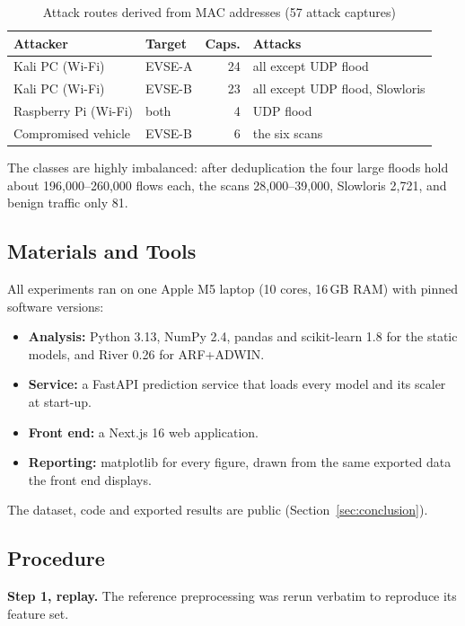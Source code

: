 \documentclass[preprint,12pt]{elsarticle}
\begin{document}
\begin{table}[!t]
\caption{Attack routes derived from MAC addresses (57 attack captures)}
\label{tab:routes}
\centering
\footnotesize
\begin{tabularx}{\columnwidth}{@{}llrL@{}}
\toprule
\textbf{Attacker} & \textbf{Target} & \textbf{Caps.} & \textbf{Attacks} \\
\midrule
Kali PC (Wi-Fi)       & EVSE-A & 24 & all except UDP flood \\
Kali PC (Wi-Fi)       & EVSE-B & 23 & all except UDP flood, Slowloris \\
Raspberry Pi (Wi-Fi)  & both   & 4  & UDP flood \\
Compromised vehicle   & EVSE-B & 6  & the six scans \\
\bottomrule
\end{tabularx}
\end{table}

The classes are highly imbalanced: after deduplication the four large floods hold about 196,000--260,000 flows each, the scans 28,000--39,000, Slowloris 2,721, and benign traffic only 81.

\subsection{Materials and Tools}

All experiments ran on one Apple M5 laptop (10 cores, 16\,GB RAM) with pinned software versions:
\begin{itemize}
    \item \textbf{Analysis:} Python 3.13, NumPy 2.4, pandas and scikit-learn 1.8 \cite{b12} for the static models, and River 0.26 \cite{b9} for ARF+ADWIN.
    \item \textbf{Service:} a FastAPI prediction service that loads every model and its scaler at start-up.
    \item \textbf{Front end:} a Next.js 16 web application.
    \item \textbf{Reporting:} matplotlib for every figure, drawn from the same exported data the front end displays.
\end{itemize}
The dataset, code and exported results are public (Section~\ref{sec:conclusion}).

\subsection{Procedure}

\textbf{Step 1, replay.} The reference preprocessing \cite{b4} was rerun verbatim to reproduce its feature set.
\end{document}

